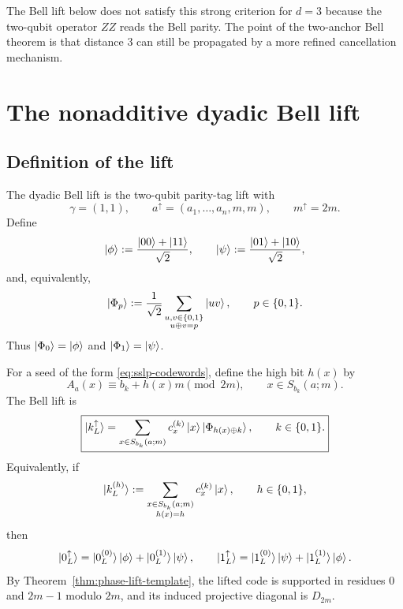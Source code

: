 \documentclass[11pt]{article}
\newcommand{\ketphi}{\ket{\phi}}
\newcommand{\ketpsi}{\ket{\psi}}
\begin{document}
The Bell lift below does not satisfy this strong criterion for $d=3$ because the two-qubit
operator $ZZ$ reads the Bell parity.  The point of the two-anchor Bell theorem is that distance
$3$ can still be propagated by a more refined cancellation mechanism.

\section{The nonadditive dyadic Bell lift}
\label{sec:dyadic-bell-lift}

\subsection{Definition of the lift}

The dyadic Bell lift is the two-qubit parity-tag lift with
\begin{equation}
  \gamma=(1,1),
  \qquad
  a^{\uparrow}=(a_1,\ldots,a_n,m,m),
  \qquad
  m^{\uparrow}=2m.
  \label{eq:bell-angle-update}
\end{equation}
Define
\begin{equation}
  \ketphi:=\frac{\ket{00}+\ket{11}}{\sqrt2},
  \qquad
  \ketpsi:=\frac{\ket{01}+\ket{10}}{\sqrt2},
  \label{eq:bell-states}
\end{equation}
and, equivalently,
\begin{equation}
  \ket{\Phi_p}:=\frac{1}{\sqrt2}
  \sum_{\substack{u,v\in\{0,1\}\\ u\oplus v=p}}\ket{uv},
  \qquad p\in\{0,1\}.
  \label{eq:bell-parity-states}
\end{equation}
Thus $\ket{\Phi_0}=\ketphi$ and $\ket{\Phi_1}=\ketpsi$.

For a seed of the form \eqref{eq:sslp-codewords}, define the high bit $h(x)$ by
\[
  A_a(x)\equiv b_k+h(x)m\pmod{2m},
  \qquad x\in S_{b_k}(a;m).
\]
The Bell lift is
\begin{equation}
  \boxed{
  \ket{k_L^{\uparrow}}
  =\sum_{x\in S_{b_k}(a;m)} c_x^{(k)}\ket{x}\ket{\Phi_{h(x)\oplus k}},
  \qquad k\in\{0,1\}.
  }
  \label{eq:bell-lift-definition}
\end{equation}
Equivalently, if
\begin{equation}
  \ket{k_L^{(h)}}:=\sum_{\substack{x\in S_{b_k}(a;m)\\ h(x)=h}}c_x^{(k)}\ket{x},
  \qquad h\in\{0,1\},
  \label{eq:low-high-pieces}
\end{equation}
then
\begin{equation}
  \ket{0_L^{\uparrow}}=\ket{0_L^{(0)}}\ketphi+\ket{0_L^{(1)}}\ketpsi,
  \qquad
  \ket{1_L^{\uparrow}}=\ket{1_L^{(0)}}\ketpsi+\ket{1_L^{(1)}}\ketphi.
  \label{eq:bell-normal-form-general}
\end{equation}
By Theorem~\ref{thm:phase-lift-template}, the lifted code is supported in residues
$0$ and $2m-1$ modulo $2m$, and its induced projective diagonal is $D_{2m}$.
\end{document}
